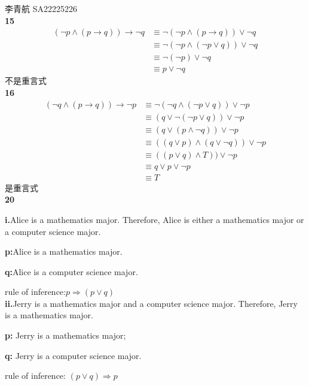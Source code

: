 \documentclass[UTF8]{ctexart}
\begin{document}
李青航 SA22225226\\
\textbf{15}\\
\begin{equation}
\nonumber
\begin{split}
(\neg p\wedge(p\rightarrow q))\rightarrow \neg q &\equiv \neg(\neg p\wedge(p\rightarrow q))\vee \neg q\\
& \equiv \neg(\neg p \wedge (\neg p \vee q))\vee \neg q\\
& \equiv \neg(\neg p )\vee \neg q\\
& \equiv p \vee \neg q
\end{split}
\end{equation}
不是重言式\\

\noindent\textbf{16}\\
\begin{equation}
\nonumber
\begin{split}
(\neg q \wedge (p \rightarrow q))\rightarrow \neg p
& \equiv \neg(\neg q \wedge(\neg p \vee q)) \vee \neg p\\
& \equiv (q \vee \neg (\neg p \vee q)) \vee \neg p\\
& \equiv (q \vee (p \wedge \neg q))\vee \neg p\\
& \equiv ((q \vee p) \wedge (q \vee \neg q))\vee \neg p \\
& \equiv ((p\vee q) \wedge T)) \vee \neg p\\
& \equiv q \vee p\vee \neg p \\
&\equiv T
\end{split}
\end{equation}
是重言式\\

\noindent\textbf{20}

\textbf{i.}Alice is a mathematics major. Therefore, Alice is either a mathematics major or a computer science major.

\textbf{p:}Alice is a mathematics major.

\textbf{q:}Alice is a computer science major.

rule of inference:$p\Rightarrow (p\vee q)$\\

\textbf{ii.}Jerry is a mathematics major and a computer science major. Therefore, Jerry is a mathematics major.

\textbf{p:} Jerry is a mathematics major;

\textbf{q:} Jerry is a computer science major.

rule of inference: $(p\vee q)\Rightarrow p$\\
\end{document}
